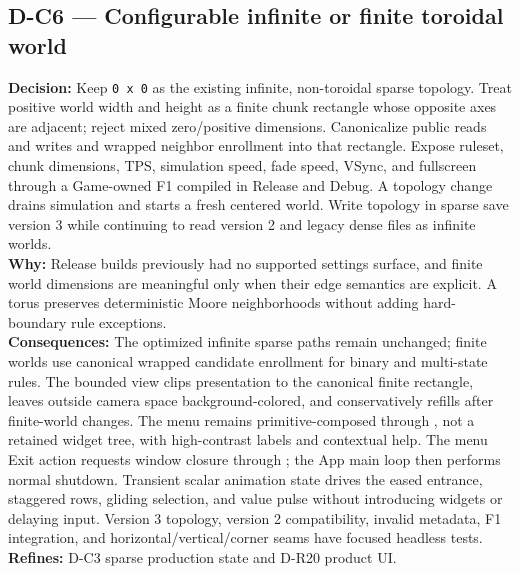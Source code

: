 \subsection*{D-C6 --- Configurable infinite or finite toroidal world}
\begin{decisionbox}[title={D-C6 \quad 2026-08-17}]
\textbf{Decision:} Keep \texttt{0 x 0} as the existing infinite,
non-toroidal sparse topology. Treat positive world width and height as a
finite chunk rectangle whose opposite axes are adjacent; reject mixed
zero/positive dimensions. Canonicalize public reads and writes and wrapped
neighbor enrollment into that rectangle. Expose ruleset, chunk dimensions,
TPS, simulation speed, fade speed, VSync, and fullscreen through a Game-owned
F1  compiled in Release and Debug. A topology
change drains simulation and starts a fresh centered world. Write topology in
sparse save version 3 while continuing to read version 2 and legacy dense
files as infinite worlds.\\
\textbf{Why:} Release builds previously had no supported settings surface, and
finite world dimensions are meaningful only when their edge semantics are
explicit. A torus preserves deterministic Moore neighborhoods without adding
hard-boundary rule exceptions.\\
\textbf{Consequences:} The optimized infinite sparse paths remain unchanged;
finite worlds use canonical wrapped candidate enrollment for binary and
multi-state rules. The bounded view clips presentation to the canonical finite
rectangle, leaves outside camera space background-colored, and conservatively
refills after finite-world changes. The menu remains primitive-composed through
, not a retained widget tree, with high-contrast labels
and contextual help. The menu Exit action requests window closure through
; the App main loop then performs normal shutdown.
Transient scalar animation state drives the eased entrance, staggered rows,
gliding selection, and value pulse without introducing widgets or delaying
input.
Version 3 topology, version 2 compatibility, invalid metadata, F1 integration,
and horizontal/vertical/corner seams have focused headless tests.\\
\textbf{Refines:} D-C3 sparse production state and D-R20 product UI.
\end{decisionbox}

